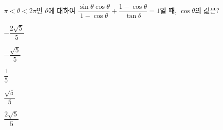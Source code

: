$\pi<\theta<2\pi$인 $\theta$에 대하여 $\dfrac{\sin\theta\cos\theta}{1-\cos\theta}+\dfrac{1-\cos\theta}{\tan\theta}=1$일 때, $\cos\theta$의 값은?
\begin{choices32}{\rule[-3ex]{0pt}{8ex}$-\dfrac{2\sqrt{5}}{5}$}{\rule[-3ex]{0pt}{8ex}$-\dfrac{\sqrt{5}}{5}$}{\rule[-3ex]{0pt}{8ex}$\dfrac{1}{5}$}{\rule[-3ex]{0pt}{8ex}$\dfrac{\sqrt{5}}{5}$}{\rule[-3ex]{0pt}{8ex}$\dfrac{2\sqrt{5}}{5}$}\end{choices32}

